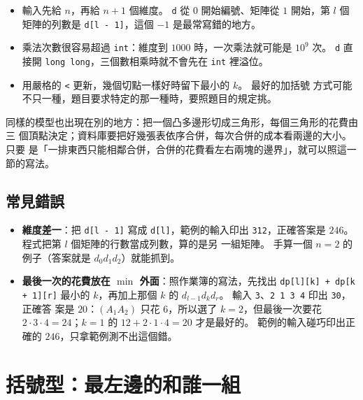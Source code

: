 
\begin{itemize}
\item 輸入先給 $n$，再給 $n + 1$ 個維度。 \texttt{d} 從 $0$ 開始編號、矩陣從
$1$ 開始，第 $l$ 個矩陣的列數是 \texttt{d[l - 1]}，這個 $-1$ 是最常寫錯的地方。
\item 乘法次數很容易超過 \texttt{int}：維度到 $1000$ 時，一次乘法就可能是
$10^9$ 次。 \texttt{d} 直接開 \texttt{long long}，三個數相乘時就不會先在
\texttt{int} 裡溢位。
\item 用嚴格的 \texttt{<} 更新，幾個切點一樣好時留下最小的 $k$。 最好的加括號
方式可能不只一種，題目要求特定的那一種時，要照題目的規定挑。
\end{itemize}

同樣的模型也出現在別的地方：把一個凸多邊形切成三角形，每個三角形的花費由三
個頂點決定；資料庫要把好幾張表依序合併，每次合併的成本看兩邊的大小。 只要
是「一排東西只能相鄰合併，合併的花費看左右兩塊的邊界」，就可以照這一節的寫法。

\subsection{常見錯誤}

\begin{itemize}
\item \textbf{維度差一}：把 \texttt{d[l - 1]} 寫成 \texttt{d[l]}，範例的輸入印出
\texttt{312}，正確答案是 $246$。 程式把第 $l$ 個矩陣的行數當成列數，算的是另
一組矩陣。 手算一個 $n = 2$ 的例子（答案就是 $d_0 d_1 d_2$）就能抓到。
\item \textbf{最後一次的花費放在 $\min$ 外面}：照作業簿的寫法，先找出
\texttt{dp[l][k] + dp[k + 1][r]} 最小的 $k$，再加上那個 $k$ 的
$d_{l-1} d_k d_r$。 輸入 \texttt{3}、\texttt{2 1 3 4} 印出 \texttt{30}，正確答
案是 $20$：$(A_1 A_2)$ 只花 $6$，所以選了 $k = 2$，但最後一次要花
$2 \cdot 3 \cdot 4 = 24$；$k = 1$ 的 $12 + 2 \cdot 1 \cdot 4 = 20$ 才是最好的。
範例的輸入碰巧印出正確的 $246$，只拿範例測不出這個錯。
\end{itemize}

\section{括號型：最左邊的和誰一組}
\label{sec:ivdp-pair}

